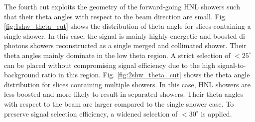 The fourth cut exploits the geometry of the forward-going HNL showers such that their theta angles with respect to the beam direction are small.                                      
Fig. \ref{fig:1shw_theta_cut} shows the distribution of theta angle for slices containing a single shower.
In this case, the signal is mainly highly energetic and boosted di-photons showers reconstructed as a single merged and collimated shower.
Their theta angles mainly dominate in the low theta region.
A strict selection of $< 25^{\circ}$ can be placed without compromising signal efficiency due to the high signal-to-background ratio in this region.
Fig. \ref{fig:2shw_theta_cut} shows the theta angle distribution for slices containing multiple showers.
In this case, HNL showers are less boosted and more likely to result in separated showers.
Their theta angles with respect to the beam are larger compared to the single shower case.
To preserve signal selection efficiency, a widened selection of $< 30^{\circ}$ is applied.

